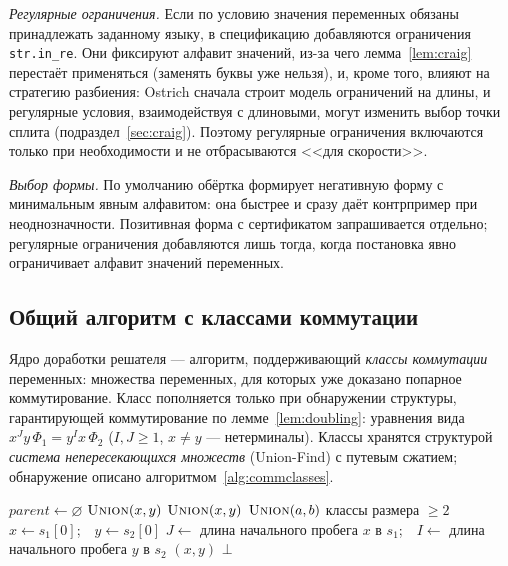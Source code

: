 \documentclass[14pt, russian]{scrartcl}
\begin{document}
\textit{Регулярные ограничения.} Если по условию значения переменных обязаны
принадлежать заданному языку, в спецификацию добавляются ограничения
\verb|str.in_re|. Они фиксируют алфавит значений, из-за чего лемма~\ref{lem:craig}
перестаёт применяться (заменять буквы уже нельзя), и, кроме того, влияют на стратегию
разбиения: Ostrich сначала строит модель ограничений на длины, и регулярные условия,
взаимодействуя с длиновыми, могут изменить выбор точки сплита
(подраздел~\ref{sec:craig}). Поэтому регулярные ограничения включаются только при
необходимости и не отбрасываются <<для скорости>>.

\textit{Выбор формы.} По умолчанию обёртка формирует негативную форму с минимальным явным
алфавитом: она быстрее и сразу даёт контрпример при неоднозначности. Позитивная форма с
сертификатом запрашивается отдельно; регулярные ограничения добавляются лишь тогда, когда
постановка явно ограничивает алфавит значений переменных.

\subsection{Общий алгоритм с классами коммутации}
\label{sec:commclasses}

Ядро доработки решателя --- алгоритм, поддерживающий \textit{классы коммутации}
переменных: множества переменных, для которых уже доказано попарное коммутирование.
Класс пополняется только при обнаружении структуры, гарантирующей коммутирование по
лемме~\ref{lem:doubling}: уравнения вида $x^{J} y\,\Phi_1 = y^{I} x\,\Phi_2$
($I, J \ge 1$, $x \neq y$ --- нетерминалы). Классы хранятся структурой
\textit{система непересекающихся множеств} (Union-Find) с путевым сжатием; обнаружение
описано алгоритмом~\ref{alg:commclasses}.

\begin{algorithm}[h!]
\caption{Построение классов коммутации (Union-Find)}
\label{alg:commclasses}
\begin{algorithmic}[1]
  \State $\textit{parent} \gets \varnothing$ 
      $\textsc{Union}(x, y)$ \EndIf
      $\textsc{Union}(x, y)$ \EndIf
        $\textsc{Union}(a, b)$ \EndIf
  \EndFor
  \State \Return классы размера $\ge 2$
\EndFunction
\Statex
{} 
  \State $x \gets s_1[0]$;\ \ $y \gets s_2[0]$
     \State $J \gets$ длина начального пробега $x$ в $s_1$;\ \
            $I \gets$ длина начального пробега $y$ в $s_2$
        \State \Return $(x, y)$
     \EndIf
  \EndIf
  \State \Return $\bot$
\EndFunction
\end{algorithmic}
\end{algorithm}
\end{document}
